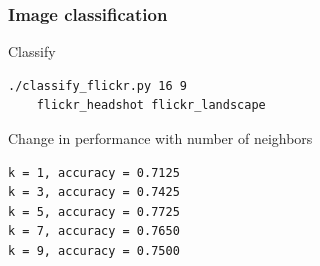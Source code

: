 \begin{frame}[fragile]
  \frametitle{Image classification}

  \begin{center}
    \begin{block}{Classify}
        \begin{lstlisting}[language=bash]
 ./classify_flickr.py 16 9 
    flickr_headshot flickr_landscape
        \end{lstlisting}
    \end{block}
    \vskip20pt
    \begin{block}{Change in performance with number of neighbors}
        \begin{lstlisting}[language=bash]
k = 1, accuracy = 0.7125
k = 3, accuracy = 0.7425
k = 5, accuracy = 0.7725
k = 7, accuracy = 0.7650
k = 9, accuracy = 0.7500
        \end{lstlisting}
    \end{block}
  \end{center}
\end{frame}
